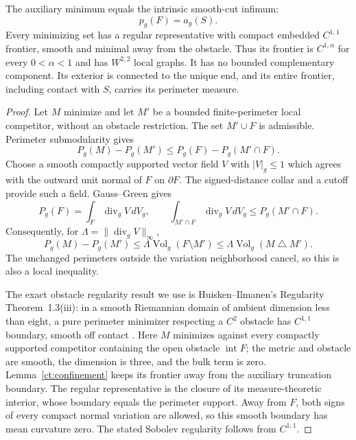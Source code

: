 \begin{proposition}
\label{ct:perimeter-equivalence}
The auxiliary minimum equals the intrinsic smooth-cut infimum:
\begin{equation}
\label{ct:infima-equal}
 p_g(F)=a_g(S).
\end{equation}
Every minimizing set has a regular representative with compact embedded
$C^{1,1}$ frontier, smooth and minimal away from the obstacle. Thus its
frontier is $C^{1,\alpha}$ for every $0<\alpha<1$ and has $W^{2,2}$
local graphs. It has no bounded complementary component. Its exterior
is connected to the unique end, and its entire frontier, including
contact with $S$, carries its perimeter measure.
\end{proposition}

\begin{proof}
Let $M$ minimize and let $M'$ be a bounded finite-perimeter local
competitor, without an obstacle restriction. The set $M'\cup F$ is
admissible. Perimeter submodularity gives
\begin{equation}
\label{ct:submodular-repair}
 P_g(M)-P_g(M')\leq P_g(F)-P_g(M'\cap F).
\end{equation}
Choose a smooth compactly supported vector field $V$ with $|V|_g\leq1$
which agrees with the outward unit normal of $F$ on $\partial F$.
The signed-distance collar and a cutoff provide such a field.
Gauss--Green gives
\[
 P_g(F)=\int_F\operatorname{div}_gV\,dV_g,\qquad
 \int_{M'\cap F}\operatorname{div}_gV\,dV_g\leq P_g(M'\cap F).
\]
Consequently, for $\Lambda=\|\operatorname{div}_gV\|_\infty$,
\begin{equation}
\label{ct:almost-minimality}
 P_g(M)-P_g(M')\leq
 \Lambda\operatorname{Vol}_g(F\setminus M')
 \leq\Lambda\operatorname{Vol}_g(M\mathbin\triangle M').
\end{equation}
The unchanged perimeters outside the variation neighborhood cancel,
so this is also a local inequality.

The exact obstacle regularity result we use is
Huisken--Ilmanen's Regularity Theorem~1.3(iii): in a smooth Riemannian
domain of ambient dimension less than eight, a pure perimeter minimizer
respecting a $C^2$ obstacle has $C^{1,1}$ boundary, smooth off contact
\cite{HuiskenIlmanen2001}. Here $M$ minimizes against every compactly
supported competitor containing the open obstacle $\operatorname{int}F$;
the metric and obstacle are smooth, the dimension is three, and the
bulk term is zero. Lemma~\ref{ct:confinement} keeps its frontier away
from the auxiliary truncation boundary. The regular representative is
the closure of its measure-theoretic interior, whose boundary equals
the perimeter support. Away from $F$, both signs of every compact
normal variation are allowed, so this smooth boundary has mean
curvature zero. The stated Sobolev regularity follows from $C^{1,1}$.


\end{proof}
